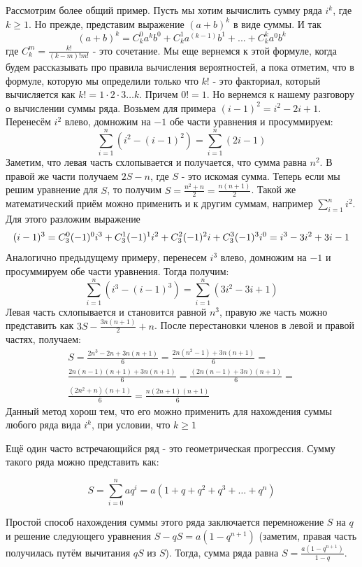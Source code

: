 Рассмотрим более общий пример. Пусть мы хотим вычислить сумму ряда $i^k$, где $k \ge 1$.
Но прежде, представим выражение $(a+b)^k$ в виде суммы. И так 
$$(a+b)^k = C^0_k a^kb^0+C^1_ka^{(k-1)}b^1 + ... + C^k_ka^0b^k$$
где $C^m_k = \frac{k!}{(k-m)!m!}$ - это сочетание.
Мы еще вернемся к этой формуле, когда будем рассказывать про правила вычисления
вероятностей, а пока отметим, что в формуле, которую мы определили только что $k!$ - это 
факториал, который вычисляется как $k! = 1\cdot2\cdot3\ldots k$. Причем $0!=1$.
Но вернемся к нашему разговору о вычислении суммы ряда. Возьмем для
примера $(i-1)^2 = i^2 - 2i + 1$.
Перенесём $i^2$ влево, домножим на $-1$ обе части уравнения и просуммируем:
$$\sum_{i=1}^n (i^2 - (i-1)^2) = \sum_{i=1}^n (2i - 1)$$
Заметим, что левая часть схлопывается и получается, что сумма 
равна $n^2$. В правой же части получаем $2S-n$, где $S$ - это искомая сумма.
Теперь если мы решим уравнение для $S$, то получим
$S = \frac{n^2+n}{2} = \frac{n(n+1)}{2}$.
Такой же математический приём можно применить и к другим суммам, например $\sum_{i=1}^n i^2$.
Для этого разложим выражение 
$$(i-1)^3 = \\ 
C_3^0(-1)^0i^3+C_3^1(-1)^1i^2 + C_3^2(-1)^2i + C^3_3(-1)^3i^0 = \\
i^3-3i^2+3i-1$$
Аналогично предыдущему примеру, перенесем $i^3$ влево, домножим на $-1$ и
просуммируем обе части уравнения. Тогда получим:
$$\sum_{i=1}^n (i^3-(i-1)^3) = \sum_{i=1}^n(3i^2-3i+1)$$
Левая часть схлопывается и становится равной $n^3$, правую же часть можно представить как
$3S-\frac{3n(n+1)}{2} + n$. После перестановки членов в левой и правой частях, получаем:
\begin{equation*}
\begin{multlined}
S=\frac{2n^3 - 2n + 3n(n+1)}{6} = \frac{2n(n^2 - 1) + 3n(n + 1)}{6} = \\
\frac{2n(n - 1)(n+1) + 3n(n+1)}{6} = \frac{(2n(n - 1) + 3n)(n+1)}{6} = \\
\frac{(2n^2 + n)(n+1)}{6} = \frac{n(2n + 1)(n+1)}{6}
\end{multlined}
\end{equation*}
Данный метод хорош тем, что его можно применить для нахождения суммы любого ряда вида $i^k$, при условии, что $k \ge 1$

Ещё один часто встречающийся ряд - это геометрическая прогрессия. Сумму такого ряда можно представить
как:

$$S = \sum_{i=0}^{n}aq^i = a(1 + q + q^2 + q^3 + \ldots + q^n)$$

Простой способ нахождения суммы этого ряда заключается перемножение $S$ 
на $q$ и решение следующего уравнения $S - qS = a(1 - q^{n+1})$ (заметим, правая часть
получилась путём вычитания $qS$ из $S$). Тогда, сумма ряда равна $S=\frac{a(1-q^{n+1})}{1-q}$.

